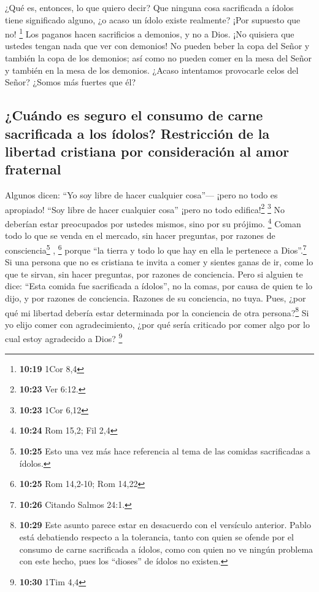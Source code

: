  ¿Qué es, entonces, lo que quiero decir? Que ninguna cosa
sacrificada a ídolos tiene significado alguno, ¿o acaso un ídolo existe
realmente? ¡Por supuesto que no! \footnote{\textbf{10:19} 1Cor 8,4}
 Los paganos hacen sacrificios a demonios, y no a Dios.
¡No quisiera que ustedes tengan nada que ver con demonios!
 No pueden beber la copa del Señor y también la copa de
los demonios; así como no pueden comer en la mesa del Señor y también en
la mesa de los demonios.  ¿Acaso intentamos provocarle
celos del Señor? ¿Somos más fuertes que él?

\hypertarget{cuuxe1ndo-es-seguro-el-consumo-de-carne-sacrificada-a-los-uxeddolos-restricciuxf3n-de-la-libertad-cristiana-por-consideraciuxf3n-al-amor-fraternal}{%
\subsection{¿Cuándo es seguro el consumo de carne sacrificada a los
ídolos? Restricción de la libertad cristiana por consideración al amor
fraternal}\label{cuuxe1ndo-es-seguro-el-consumo-de-carne-sacrificada-a-los-uxeddolos-restricciuxf3n-de-la-libertad-cristiana-por-consideraciuxf3n-al-amor-fraternal}}

 Algunos dicen: ``Yo soy libre de hacer cualquier
cosa''--- ¡pero no todo es apropiado! ``Soy libre de hacer cualquier
cosa'' ¡pero no todo edifica!\footnote{\textbf{10:23} Ver 6:12.}
\footnote{\textbf{10:23} 1Cor 6,12}  No deberían estar
preocupados por ustedes mismos, sino por su prójimo. \footnote{\textbf{10:24}
  Rom 15,2; Fil 2,4}  Coman todo lo que se venda en el
mercado, sin hacer preguntas, por razones de consciencia\footnote{\textbf{10:25}
  Esto una vez más hace referencia al tema de las comidas sacrificadas a
  ídolos.} , \footnote{\textbf{10:25} Rom 14,2-10; Rom 14,22}
 porque ``la tierra y todo lo que hay en ella le
pertenece a Dios''.\footnote{\textbf{10:26} Citando Salmos 24:1.}
 Si una persona que no es cristiana te invita a comer y
sientes ganas de ir, come lo que te sirvan, sin hacer preguntas, por
razones de conciencia.  Pero si alguien te dice: ``Esta
comida fue sacrificada a ídolos'', no la comas, por causa de quien te lo
dijo, y por razones de conciencia.  Razones de su
conciencia, no tuya. Pues, ¿por qué mi libertad debería estar
determinada por la conciencia de otra persona?\footnote{\textbf{10:29}
  Este asunto parece estar en desacuerdo con el versículo anterior.
  Pablo está debatiendo respecto a la tolerancia, tanto con quien se
  ofende por el consumo de carne sacrificada a ídolos, como con quien no
  ve ningún problema con este hecho, pues los ``dioses'' de ídolos no
  existen.}  Si yo elijo comer con agradecimiento, ¿por
qué sería criticado por comer algo por lo cual estoy agradecido a Dios?
\footnote{\textbf{10:30} 1Tim 4,4}

